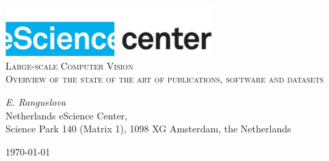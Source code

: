 \documentclass[a4paper,11pt]{article}
\begin{document}
\begin{titlepage}
\begin{center}
\includegraphics[width=0.6\textwidth]{fig/logo}\\[3cm]    
\textsc{\LARGE Large-scale Computer Vision}\\[0.5cm]
\textsc{\large Overview of the state of the art of publications, software and datasets}\\[0.5cm]
\vfill
\end{center}
{\large
\emph{E. Ranguelova} \\
}
{\large
{Netherlands eScience Center, \\
Science Park 140 (Matrix 1), 1098 XG Amsterdam, the Netherlands\\
}
}
\begin{center}
{\large \today}
\end{center}
\end{titlepage}

\tableofcontents

\newpage










\end{document}
